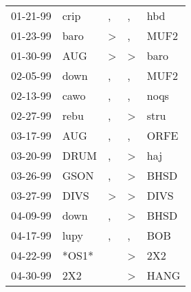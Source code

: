 \begin{supertabular}{p{0.07\textwidth}p{0.06\textwidth}p{0.02\textwidth}p{0.02\textwidth}p{0.06\textwidth}}
          01-21-99\textsuperscript{} &           crip\textsuperscript{} &                , &                , &            hbd\textsuperscript{} \\
          01-23-99\textsuperscript{} &           baro\textsuperscript{} &     \textgreater &                , &           MUF2\textsuperscript{} \\
          01-30-99\textsuperscript{} &            AUG\textsuperscript{} &     \textgreater &     \textgreater &           baro\textsuperscript{} \\
          02-05-99\textsuperscript{} &           down\textsuperscript{} &                , &                , &           MUF2\textsuperscript{} \\
          02-13-99\textsuperscript{} &           cawo\textsuperscript{} &                , &                , &           noqs\textsuperscript{} \\
          02-27-99\textsuperscript{} &           rebu\textsuperscript{} &                , &     \textgreater &           stru\textsuperscript{} \\
          03-17-99\textsuperscript{} &            AUG\textsuperscript{} &                , &                , &           ORFE\textsuperscript{} \\
          03-20-99\textsuperscript{} &           DRUM\textsuperscript{} &                , &     \textgreater &            haj\textsuperscript{} \\
          03-26-99\textsuperscript{} &           GSON\textsuperscript{} &                , &     \textgreater &           BHSD\textsuperscript{} \\
          03-27-99\textsuperscript{} &           DIVS\textsuperscript{} &     \textgreater &     \textgreater &           DIVS\textsuperscript{} \\
          04-09-99\textsuperscript{} &           down\textsuperscript{} &                , &     \textgreater &           BHSD\textsuperscript{} \\
          04-17-99\textsuperscript{} &           lupy\textsuperscript{} &                , &                , &            BOB\textsuperscript{} \\
          04-22-99\textsuperscript{} &                            *OS1* &                  &     \textgreater &            2X2\textsuperscript{} \\
          04-30-99\textsuperscript{} &            2X2\textsuperscript{} &                  &     \textgreater &           HANG\textsuperscript{} \\

\end{supertabular}
